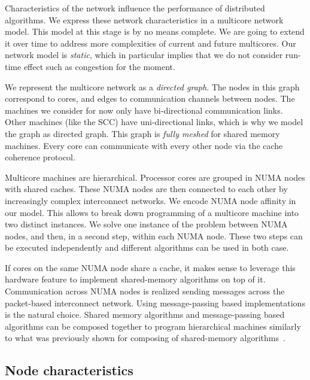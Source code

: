 \documentclass{article}
\begin{document}
Characteristics of the network influence the performance of
distributed algorithms. 
We express these network characteristics in a multicore network
model. This model at this stage is by no means complete. We are going to
extend it over time to address more complexities of current and future
multicores.
Our network model is \emph{static}, which in particular implies that
we do not consider run-time effect such as congestion for the moment.

We represent the multicore network as a \emph{directed graph}. The nodes in
this graph correspond to cores, and edges to communication channels
between nodes. The machines we consider for now only have
bi-directional communication links. Other machines (like the SCC) have
uni-directional links, which is why we model the graph as directed
graph.
This graph is \emph{fully meshed} for shared memory machines. Every core can
communicate with every other node via the cache coherence protocol.

Multicore machines are hierarchical. Processor cores are grouped in
NUMA nodes with shared caches. These NUMA nodes are then connected to
each other by increasingly complex interconnect networks. 
We encode NUMA node affinity in our model. This allows to break down
programming of a multicore machine into two distinct instances. We
solve one instance of the problem between NUMA nodes, and then, in a
second step, within each NUMA node. These two steps can be executed
independently and different algorithms can be used in both case.

If cores on the same NUMA node share a cache, it makes sense to
leverage this hardware feature to implement shared-memory algorithms
on top of it. %
Communication across NUMA nodes is realized sending messages across
the packet-based interconnect network. Using message-passing based
implementations is the natural choice. %
Shared memory algorithms and message-passing based algorithms can be
composed together to program hierarchical machines similarly to what
was previously shown for composing of shared-memory
algorithms~\cite{Alistarh2012}.

\subsection{Node characteristics} 
\label{sec:model_nodes}
\end{document}

